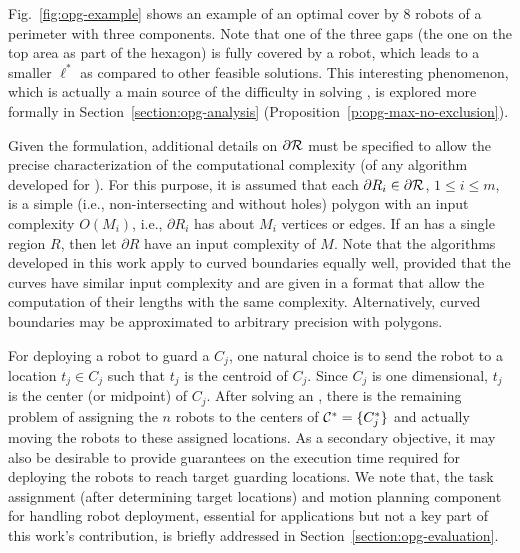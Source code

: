 Fig.~\ref{fig:opg-example} shows an example of an optimal cover by $8$ robots 
of a perimeter with three components. Note that one of the three gaps 
(the one on the top area as part of the hexagon) is fully covered 
by a robot, which leads to a smaller $\ell^*$ as compared to other 
feasible solutions. This interesting phenomenon, which is 
actually a main source of the difficulty in solving \opg, is explored 
more formally in Section~\ref{section:opg-analysis} 
(Proposition~\ref{p:opg-max-no-exclusion}).

Given the \opg formulation, additional details on $\partial \mathcal R$ must 
be specified to allow the precise characterization of the computational 
complexity (of any algorithm developed for \opg). For this purpose, it 
is assumed that each $\partial R_i \in \partial \mathcal R$, $1 \le i \le m$, 
is a simple (i.e., non-intersecting and without holes) polygon with an 
input complexity $O(M_i)$, i.e., $\partial R_i$ has about $M_i$ vertices 
or edges. If an \opg has a single region $R$, then let $\partial R$ have 
an input complexity of $M$. Note that the algorithms developed in this 
work apply to curved boundaries equally well, provided that the curves 
have similar input complexity and are given in a format that allow the 
computation of their lengths with the same complexity. 
Alternatively, curved boundaries may be approximated to arbitrary 
precision with polygons. 


For deploying a robot to guard a $C_j$, one natural choice is to send the 
robot to a location $t_j \in C_j$ such that $t_j$ is the centroid of $C_j$. 
Since $C_j$ is one dimensional, $t_j$ is the center (or midpoint) of $C_j$. 
After solving an \opg, there is the remaining problem of assigning the $n$ 
robots to the centers of $\mathcal C^* = \{C_j^*\}$ and actually moving the robots 
to these assigned locations. As a secondary objective, it may also be 
desirable to provide guarantees on the execution time required for 
deploying the robots to reach target guarding locations. We note that, 
the task assignment (after determining target locations) and motion 
planning component for handling robot deployment, essential for applications 
but not a key part of this work's contribution, is briefly addressed in 
Section~\ref{section:opg-evaluation}. 

